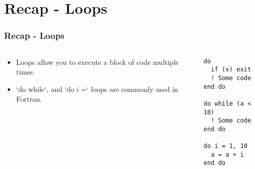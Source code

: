 \section{Recap - Loops}

\begin{frame}[fragile]
  \frametitle{Recap - Loops}
  \begin{columns}[T]
    \begin{column}{0.5\textwidth}
    \begin{itemize}
        \item Loops allow you to execute a block of code multiple times.
        \item `do while`, and `do i =` loops are commonly used in Fortran.
      \end{itemize}
    \end{column}

    \begin{column}{0.5\textwidth}
      \begin{lstlisting}
do
  if (x) exit
  ! Some code
end do

do while (a < 10)
  ! Some code
end do

do i = 1, 10
  a = a + i
end do
      \end{lstlisting}
    \end{column}
  \end{columns}
\end{frame}



